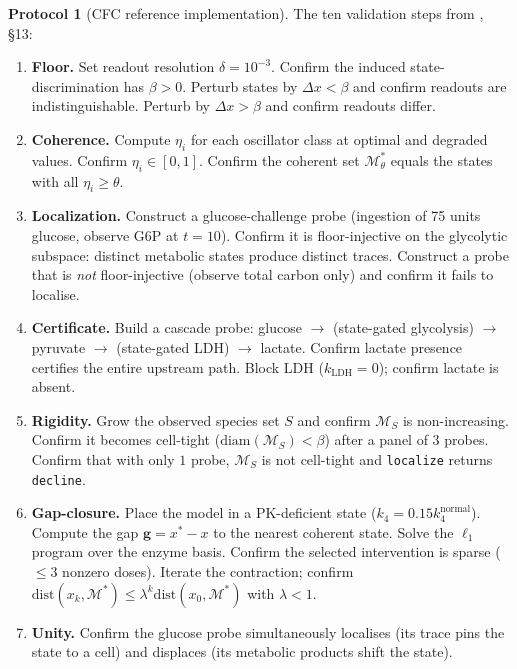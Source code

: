 \documentclass[11pt,a4paper]{article}
\theoremstyle{expthm}
\theoremstyle{definition}
\newtheorem{protocol}[theorem]{Protocol}
\theoremstyle{remark}
\newcommand{\flo}{\beta}
\newcommand{\ecoh}{\eta}
\newcommand{\cf}[1]{\texttt{#1}}
\begin{document}
\begin{protocol}[CFC reference implementation]
\label{prot:cfc}
The ten validation steps from \citep{sachikonye2026cfc}, \S13:
\begin{enumerate}[leftmargin=1.4em,itemsep=3pt]
\item \textbf{Floor.} Set readout resolution $\delta = 10^{-3}$.
  Confirm the induced state-discrimination has $\flo > 0$. Perturb
  states by $\Delta x < \flo$ and confirm readouts are
  indistinguishable. Perturb by $\Delta x > \flo$ and confirm readouts
  differ.
\item \textbf{Coherence.} Compute $\ecoh_i$ for each oscillator class
  at optimal and degraded values. Confirm $\ecoh_i \in [0,1]$. Confirm
  the coherent set $\mathcal{M}^*_\theta$ equals the states with all
  $\ecoh_i \geq \theta$.
\item \textbf{Localization.} Construct a glucose-challenge probe
  (ingestion of 75 units glucose, observe G6P at $t = 10$). Confirm it
  is floor-injective on the glycolytic subspace: distinct metabolic
  states produce distinct traces. Construct a probe that is \emph{not}
  floor-injective (observe total carbon only) and confirm it fails to
  localise.
\item \textbf{Certificate.} Build a cascade probe:
  glucose $\to$ (state-gated glycolysis) $\to$ pyruvate $\to$
  (state-gated LDH) $\to$ lactate. Confirm lactate presence certifies
  the entire upstream path. Block LDH ($k_{\mathrm{LDH}} = 0$); confirm
  lactate is absent.
\item \textbf{Rigidity.} Grow the observed species set $S$ and confirm
  $\mathcal{M}_S$ is non-increasing. Confirm it becomes cell-tight
  ($\mathrm{diam}(\mathcal{M}_S) < \flo$) after a panel of $3$ probes.
  Confirm that with only $1$ probe, $\mathcal{M}_S$ is not cell-tight
  and \cf{localize} returns \cf{decline}.
\item \textbf{Gap-closure.} Place the model in a PK-deficient state
  ($k_4 = 0.15 k_4^{\mathrm{normal}}$). Compute the gap
  $\mathbf{g} = x^* - x$ to the nearest coherent state. Solve the
  $\ell_1$ program over the enzyme basis. Confirm the selected
  intervention is sparse ($\leq 3$ nonzero doses). Iterate the
  contraction; confirm $\mathrm{dist}(x_k, \mathcal{M}^*) \leq
  \lambda^k \mathrm{dist}(x_0, \mathcal{M}^*)$ with $\lambda < 1$.
\item \textbf{Unity.} Confirm the glucose probe simultaneously
  localises (its trace pins the state to a cell) and displaces (its
  metabolic products shift the state).

\end{enumerate}
\end{protocol}
\end{document}

